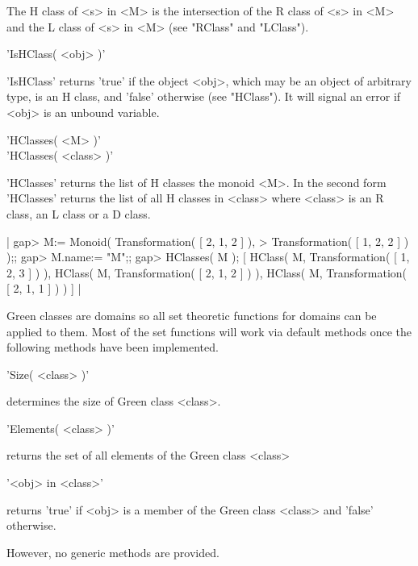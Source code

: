 The H class of <s>  in <M> is the intersection  of the R  class of <s> in
<M> and the L class of <s> in <M> (see "RClass" and "LClass").

%

'IsHClass( <obj> )'

'IsHClass' returns 'true' if the object <obj>,  which may be an object of
arbitrary type, is an H class, and 'false' otherwise  (see "HClass").  It
will signal an error if <obj> is an unbound variable.


'HClasses( <M> )'\\
'HClasses( <class> )'

'HClasses' returns the list of  H classes the  monoid <M>.  In the second
form 'HClasses'  returns  the list of  all   H classes in  <class>  where
<class> is an R class, an L class or a D class.

|    gap> M:= Monoid( Transformation( [ 2, 1, 2 ] ),
    > Transformation( [ 1, 2, 2 ] ) );;
    gap> M.name:= "M";;
    gap> HClasses( M );
    [ HClass( M, Transformation( [ 1, 2, 3 ] ) ), 
      HClass( M, Transformation( [ 2, 1, 2 ] ) ), 
      HClass( M, Transformation( [ 2, 1, 1 ] ) ) ] |


Green classes are domains so all set theoretic  functions for domains can
be  applied to them.  Most  of the  set functions  will  work via default
methods once the following methods have been implemented.

'Size( <class> )'%

determines the size of Green class <class>.

'Elements( <class> )'%

returns the set of all elements of the Green class <class>

'<obj> in <class>'%
%

returns 'true' if  <obj>  is a member  of   the Green class <class>   and
'false' otherwise.

However, no generic methods are provided.

